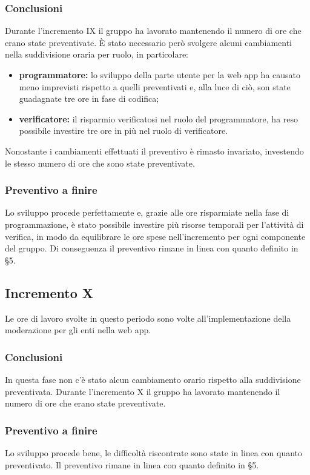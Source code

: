 		\subsubsection*{Conclusioni}
			Durante l'incremento IX il gruppo ha lavorato mantenendo il numero di ore che erano state preventivate. È stato necessario però svolgere alcuni cambiamenti nella suddivisione oraria per ruolo, in particolare:
		\begin{itemize}
			\item \textbf{programmatore:} lo sviluppo della parte utente per la web app ha causato meno imprevisti rispetto a quelli preventivati e, alla luce di ciò, son state guadagnate tre ore in fase di codifica;
			\item \textbf{verificatore:} il risparmio verificatosi nel ruolo del programmatore, ha reso possibile investire tre ore in più nel ruolo di verificatore.
		\end{itemize}
			Nonostante i cambiamenti effettuati il preventivo è rimasto invariato, investendo le stesso numero di ore che sono state preventivate.
		
		\subsubsection{Preventivo a finire}
			Lo sviluppo procede perfettamente e, grazie alle ore risparmiate nella fase di programmazione, è stato possibile investire più risorse temporali per l'attività di verifica, in modo da equilibrare le ore spese nell'incremento per ogni componente del gruppo. 
			\newline
			Di conseguenza il preventivo rimane in linea con quanto definito in \S5.
	
		
		\subsection{Incremento X}
			Le ore di lavoro svolte in questo periodo sono volte all'implementazione della moderazione per gli enti nella web app.
		
		\subsubsection{Conclusioni}
			In questa fase non c'è stato alcun cambiamento orario rispetto alla suddivisione preventivata.
			Durante l'incremento X il gruppo ha lavorato mantenendo il numero di ore che erano state preventivate. 
		
		\subsubsection{Preventivo a finire}
			Lo sviluppo procede bene, le difficoltà riscontrate sono state in linea con quanto preventivato.
			Il preventivo rimane in linea con quanto definito in \S5.
			\pagebreak

